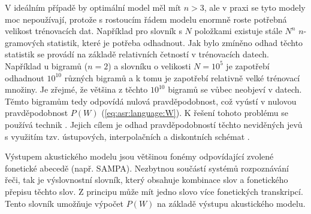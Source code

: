 \noindent V ideálním případě by optimální model měl mít $n > 3$, ale v praxi se tyto modely moc nepoužívají, protože s rostoucím řádem modelu enormně roste potřebná velikost trénovacích dat. Například pro slovník s $N$ položkami existuje stále $N^{n}$ $n$-gramových statistik, které je potřeba odhadnout. Jak bylo zmíněno odhad těchto statistik se provádí na základě relativních četností v trénovacích datech. Například u bigramů ($n=2$) a slovníku o velikosti $N=10^{5}$ je zapotřebí odhadnout $10^{10}$ různých bigramů a k tomu je zapotřebí relativně velké trénovací množiny. Je zřejmé, že většina z těchto $10^{10}$ bigramů se vůbec neobjeví v datech. Těmto  bigramům tedy odpovídá nulová pravděpodobnost, což vyústí v nulovou pravděpodobnost $P\left(W\right)$ (\ref{eq:asr:language:W}). K řešení tohoto problému se používá technik . Jejich cílem je odhad pravděpodobností těchto neviděných jevů s využitím tzv. ústupových, interpolačních a diskontních schémat \cite{Psutka2006}.

Výstupem akustického modelu jsou většinou fonémy odpovídající zvolené fonetické abecedě (např. SAMPA). Nezbytnou součástí systémů rozpoznávání řeči, tak je výslovnostní slovník, který obsahuje kombinace slov a fonetického přepisu těchto slov. Z principu může mít jedno slovo více fonetických transkripcí. Tento slovník umožňuje výpočet $P\left(W\right)$ na základě výstupu akustického modelu.
